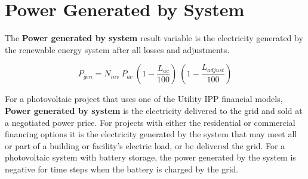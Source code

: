 \documentclass[12pt,letterpaper]{article}
\begin{document}
\section{Power Generated by System} \label{sec-hourlyenergy}

The \textbf{Power generated by system} result variable is the electricity generated by the renewable energy system after all losses and adjustments.

\begin{equation}
P_{gen}=  N_{inv}~P_{ac}~\left(1-\frac{L_{ac}}{100}\right)~\left(1-\frac{L_{\textit{adjust}}}{100}\right)
\end{equation}

For a photovoltaic project that uses one of the Utility IPP financial models, \textbf{Power generated by system} is the electricity delivered to the grid and sold at a negotiated power price. For projects with either the residential or commercial financing options it is the electricity generated by the system that may meet all or part of a building or facility's electric load, or be delivered the grid. For a photovoltaic system with battery storage, the power generated by the system is negative for time steps when the battery is charged by the grid.



\cleardoublepage

\label{sec:Bib}
%
\end{document}
